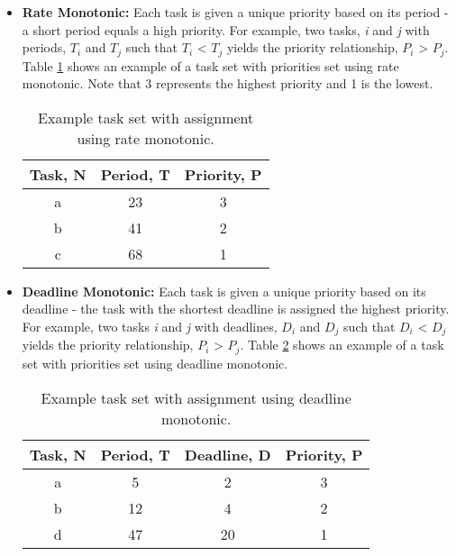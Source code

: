 \begin{itemize}
	\item \textbf{Rate Monotonic:} Each task is given a unique priority based on its period - a short period equals a high priority. For example, two tasks, \textit{i} and \textit{j} with periods, $T_i$ and $T_j$ such that $T_i$ < $T_j$ yields the priority relationship, $P_i$ > $P_j$. Table \ref{table:FPSRateMon} shows an example of a task set with priorities set using rate monotonic. Note that 3 represents the highest priority and 1 is the lowest.

	\begin{table}[ht]
			\centering
			\begin{tabular}{c c c}
			\hline
			Task, N & Period, T & Priority, P \\ [0.5ex]
			\hline 
			a & 23 & 3 \\
			b & 41 & 2 \\
			c & 68 & 1 \\ [1ex]
			\hline
			\end{tabular}
			\caption{Example task set with assignment using rate monotonic.}
		\label{table:FPSRateMon}
	\end{table}

	\item \textbf{Deadline Monotonic:} Each task is given a unique priority based on its deadline - the task with the shortest deadline is assigned the highest priority. For example, two tasks \textit{i} and \textit{j} with deadlines, $D_i$ and $D_j$ such that $D_i$ < $D_j$ yields the priority relationship, $P_i$ > $P_j$. Table \ref{table:FPSDeadlineMon} shows an example of a task set with priorities set using deadline monotonic.

	\begin{table}[ht]
			\centering
			\begin{tabular}{c c c c}
			\hline
			Task, N & Period, T & Deadline, D & Priority, P \\ [0.5ex]
			\hline 
			a & 5  & 2  & 3 \\
			b & 12 & 4  & 2 \\
			d & 47 & 20 & 1 \\ [1ex]
			\hline
			\end{tabular}
			\caption{Example task set with assignment using deadline monotonic.}
		\label{table:FPSDeadlineMon}
	\end{table}

\end{itemize}

